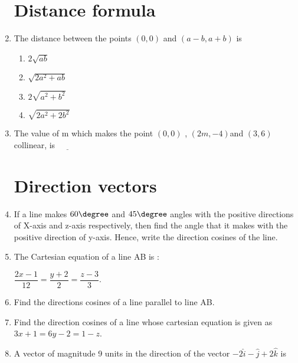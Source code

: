 \begin{enumerate}
\section{Distance formula}
\item The distance between the points $(0,0)$ and $(a-b, a+b)$ is                                             
\begin{enumerate}                                     
\item $2{\sqrt{ab}}$                                  
\item $\sqrt{2a^2 + ab}$                              
\item $ 2\sqrt{a^2 + b^2}$                            
\item $ \sqrt{2a^2 + 2b^2}$                           
\end{enumerate}                                       
\item The value of m which makes the point $(0,0)$ , $( 2m,-4)$and $(3,6)$ collinear, is $\underline{\hspace{1cm}}$
\section{Direction vectors}
\item  If a line makes $60\degree$  and $45\degree$ angles with the positive directions of X-axis and z-axis respectively, then find the angle that it makes with the positive direction of y-axis. Hence, write the direction cosines of the line.
\item The Cartesian equation of a line AB is :         
\begin{center}                                         $\dfrac{2x-1}{12} = \dfrac{ y+2}{2} = \dfrac{z-3}{3}$.\\                                                  
\end{center}
\item Find the directions cosines of a line parallel to line AB.                                             
\item Find the direction cosines of a line whose cartesian equation is given as $3x + 1 = 6y - 2 = 1 - z$.  
\item A vector of magnitude 9 units in the direction of the vector $-2\hat{i} - \hat{j} + 2\hat{k}$ is \underline{\hspace{1cm}}

\end{enumerate}
